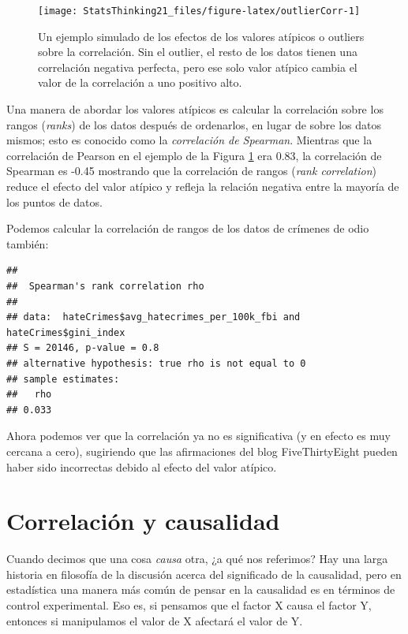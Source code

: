\documentclass[
  12pt,
]{book}
\begin{document}
\begin{figure}
\texttt{[image: StatsThinking21\_files/figure-latex/outlierCorr-1]} \caption{Un ejemplo simulado de los efectos de los valores atípicos o outliers sobre la correlación.  Sin el outlier, el resto de los datos tienen una correlación negativa perfecta, pero ese solo valor atípico cambia el valor de la correlación a uno positivo alto.}\label{fig:outlierCorr}
\end{figure}

Una manera de abordar los valores atípicos es calcular la correlación sobre los rangos (\emph{ranks}) de los datos después de ordenarlos, en lugar de sobre los datos mismos; esto es conocido como la \emph{correlación de Spearman}. Mientras que la correlación de Pearson en el ejemplo de la Figura \ref{fig:outlierCorr} era 0.83, la correlación de Spearman es -0.45 mostrando que la correlación de rangos (\emph{rank correlation}) reduce el efecto del valor atípico y refleja la relación negativa entre la mayoría de los puntos de datos.

Podemos calcular la correlación de rangos de los datos de crímenes de odio también:

\begin{verbatim}
## 
##  Spearman's rank correlation rho
## 
## data:  hateCrimes$avg_hatecrimes_per_100k_fbi and hateCrimes$gini_index
## S = 20146, p-value = 0.8
## alternative hypothesis: true rho is not equal to 0
## sample estimates:
##   rho 
## 0.033
\end{verbatim}

Ahora podemos ver que la correlación ya no es significativa (y en efecto es muy cercana a cero), sugiriendo que las afirmaciones del blog FiveThirtyEight pueden haber sido incorrectas debido al efecto del valor atípico.

\hypertarget{correlaciuxf3n-y-causalidad}{%
\section{Correlación y causalidad}\label{correlaciuxf3n-y-causalidad}}

Cuando decimos que una cosa \emph{causa} otra, ¿a qué nos referimos? Hay una larga historia en filosofía de la discusión acerca del significado de la causalidad, pero en estadística una manera más común de pensar en la causalidad es en términos de control experimental. Eso es, si pensamos que el factor X causa el factor Y, entonces si manipulamos el valor de X afectará el valor de Y.
\end{document}
